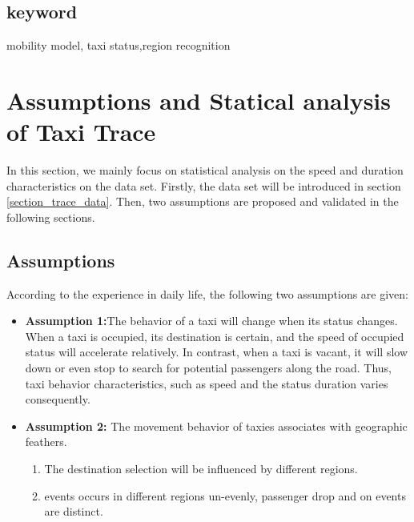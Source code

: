 \documentclass[twocolumn,10pt]{IEEEtran}
\begin{document}
\subsection*{keyword}
mobility model, taxi status,region recognition




\section{Assumptions and Statical analysis of Taxi Trace}
\label{section_assumptions_anlysis}

In this section, we mainly focus on statistical analysis on the speed and duration characteristics on the data set.
Firstly, the data set will be introduced in section \ref{section_trace_data}. Then, two assumptions are proposed and validated in the following sections.



\subsection{Assumptions}
\label{section_statistic_analysis}
According to the experience in daily life, the following two assumptions are given:

\begin{itemize}
  \item \textbf{Assumption 1:}The behavior of a taxi will change when its status changes. When a taxi is occupied, its destination is certain, and the speed of occupied status will accelerate relatively. In contrast, when a taxi is vacant, it will slow down or even stop to search for potential passengers along the road. Thus, taxi behavior characteristics, such as speed and the status duration varies consequently.

  \item \textbf{Assumption 2:} The movement behavior of taxies associates with geographic feathers.
      \begin{enumerate}
        \item The destination selection will be influenced by different regions.
        \item events occurs in different regions un-evenly, passenger drop and on events are distinct.
      \end{enumerate}
\end{itemize}
\end{document}
